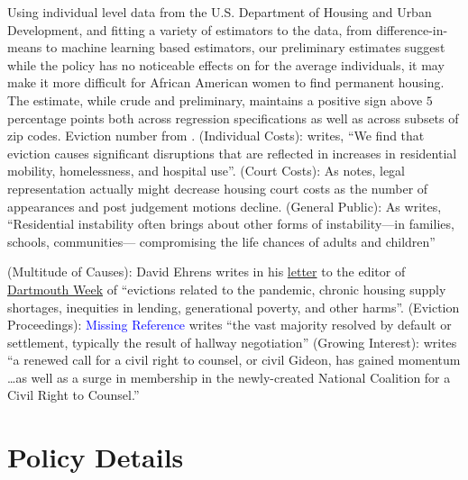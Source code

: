 \documentclass[a4paper,12pt]{article}
\begin{document}
Using individual level data from the U.S. Department of Housing and Urban Development, and fitting a variety of estimators to the data, from difference-in-means to machine learning based estimators, our preliminary estimates suggest while the policy has no noticeable effects on for the average individuals, it may make it more difficult for African American women to find permanent housing. The estimate, while crude and preliminary, maintains a positive sign above $5$ percentage points both across regression specifications as well as across subsets of zip codes. 
Eviction number from \cite{gromis2022estimating}. (Individual Costs): \cite{collinson2022eviction} writes, ``We find that eviction causes significant disruptions that are reflected in increases in residential mobility, homelessness, and hospital use''. (Court Costs): As \cite{seron2001impact} notes, legal representation actually might decrease housing court costs as the number of appearances and post judgement motions decline. (General Public): As \cite{desmond2019unaffordable} writes, ``Residential instability often brings about other forms of instability—in families, schools, communities— compromising the life chances of adults and children''

(Multitude of Causes):  David Ehrens writes in his \href{https://dartmouth.theweektoday.com/article/opinion-support-right-counsel-renters/58185}{letter} to the editor of \href{https://dartmouth.theweektoday.com/}{Dartmouth Week} of ``evictions related to the pandemic, chronic housing supply shortages, inequities in lending, generational poverty, and other harms''. (Eviction Proceedings): \textcolor{blue}{Missing Reference} writes ``the vast majority resolved by default or settlement, typically the result of hallway negotiation'' (Growing Interest): \cite{engler2010connecting} writes ``a renewed call for a civil right to counsel, or civil Gideon, has gained momentum \dots as well as a surge in membership in the newly-created National Coalition for a Civil Right to Counsel.''

\section{Policy Details}
\end{document}
